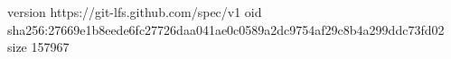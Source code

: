 version https://git-lfs.github.com/spec/v1
oid sha256:27669e1b8eede6fc27726daa041ae0c0589a2dc9754af29c8b4a299ddc73fd02
size 157967

